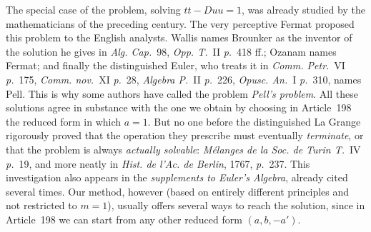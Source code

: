 The special case of the problem, solving \(tt-Duu=1\), was already studied by the mathematicians of the preceding century. The very perceptive Fermat proposed this problem to the English analysts. Wallis names Brounker as the inventor of the solution he gives in \textit{Alg. Cap.}~98, \textit{Opp. T.}~II \textit{p.}~418 ff.; Ozanam names Fermat; and finally the distinguished Euler, who treats it in \textit{Comm. Petr.}~VI \textit{p.}~175, \textit{Comm. nov.}~XI \textit{p.}~28, \textit{Algebra P.}~II \textit{p.}~226, \textit{Opusc. An.}~I \textit{p.}~310, names Pell. This is why
some authors have called the problem \textit{Pell's problem}. All these solutions agree in substance with the one we obtain by choosing in Article~198 the reduced form in which \(a=1\). But no one before the distinguished La Grange rigorously proved that the operation they prescribe must eventually \textit{terminate}, or that the problem is always \textit{actually solvable}: \textit{Mélanges de la Soc. de Turin T.}~IV \textit{p.}~19, and more neatly in \textit{Hist. de l'Ac. de Berlin}, 1767, \textit{p.}~237. This investigation also appears in the \textit{supplements to Euler's Algebra}, already cited several times. Our method, however (based on entirely different principles and not restricted to \(m=1\)), usually offers several ways to reach the solution, since in Article~198 we can start from any other reduced form \((a,b,-a')\).
